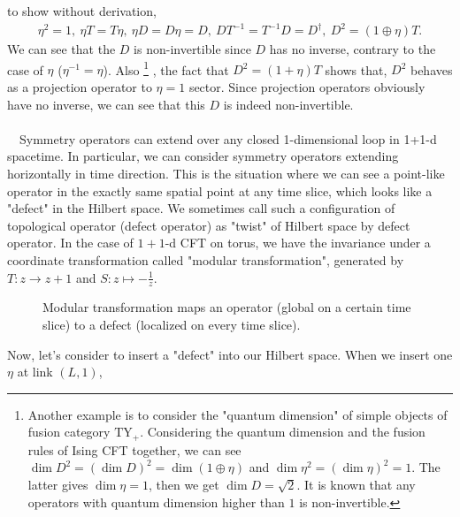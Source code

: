 \documentclass{ltjsarticle}
\theoremstyle{mystyle} %
\numberwithin{equation}{section}
\begin{document}
to show without derivation, 
\begin{align}
    \eta^2=1, ~\eta T = T \eta, ~\eta D = D \eta = D, ~ DT^{-1} = T^{-1}D = D^\dagger, ~
    D^2 = (1\oplus \eta)T. 
    \label{IsingSym}
\end{align}
We can see that the $D$ is non-invertible since $D$ has no inverse, contrary to the case of $\eta$ ($\eta^{-1}=\eta$). 
Also
\footnote{
    Another example is to consider the "quantum dimension" of simple objects of fusion category $\mathrm{TY_{+}}$. 
    Considering the quantum dimension and the fusion rules of Ising CFT together, we can see
    $\dim{D^2}=(\dim{D})^2 = \dim (1\oplus \eta)$ and $\dim{\eta^2}= (\dim{\eta})^2 = 1$. 
    The latter gives $\dim{\eta}=1$, then we get $\dim{D}=\sqrt{2}$. 
    It is known that any operators with quantum dimension higher than $1$ is non-invertible. 
    }
, the fact that $D^2 = (1+\eta)T$ shows that, 
$D^2$ behaves as a projection operator to $\eta=1$ sector. 
Since projection operators obviously have no inverse, we can see that this $D$ is indeed non-invertible. \\
\\
　Symmetry operators can extend over any closed 1-dimensional loop in 1+1-d spacetime. 
In particular, we can consider symmetry operators extending horizontally in time direction. 
This is the situation where we can see a point-like operator in the exactly same spatial point at any time slice, 
which looks like a "defect" in the Hilbert space. 
We sometimes call such a configuration of topological operator (defect operator) as "twist" of Hilbert space by defect operator. 
In the case of $1+1$-d CFT on torus, we have the invariance under a coordinate transformation called "modular transformation", 
generated by $T: z\to z + 1$ and $S: z\mapsto -\frac{1}{z}$. 
\begin{figure}[H]
    \centering
    \caption{Modular transformation maps an operator (global on a certain time slice) to a defect (localized on every time slice). }
    \label{SymmetryAndDefect}
    \end{figure}
Now, let's consider to insert a "defect" into our Hilbert space. 
When we insert one $\eta$ at link $(L, 1)$, 
\end{document}
